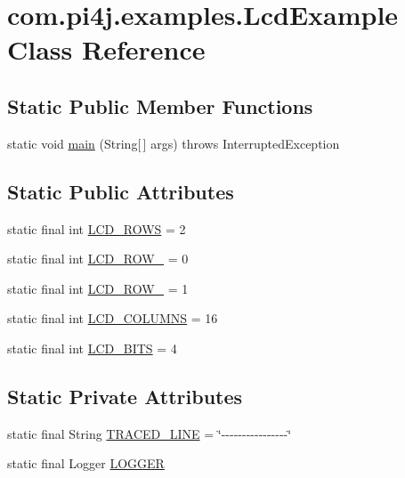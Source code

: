 \hypertarget{classcom_1_1pi4j_1_1examples_1_1LcdExample}{}\section{com.\+pi4j.\+examples.\+Lcd\+Example Class Reference}
\label{classcom_1_1pi4j_1_1examples_1_1LcdExample}
\subsection*{Static Public Member Functions}
\begin{DoxyCompactItemize}
\item 
static void \hyperlink{classcom_1_1pi4j_1_1examples_1_1LcdExample_a09001ffe6860f9ff7d1b9b195eecf3a6}{main} (String\mbox{[}$\,$\mbox{]} args)  throws Interrupted\+Exception 
\end{DoxyCompactItemize}
\subsection*{Static Public Attributes}
\begin{DoxyCompactItemize}
\item 
static final int \hyperlink{classcom_1_1pi4j_1_1examples_1_1LcdExample_aa5552e877b90e91658ff69c91110f97a}{L\+C\+D\+\_\+\+R\+O\+W\+S} = 2
\item 
static final int \hyperlink{classcom_1_1pi4j_1_1examples_1_1LcdExample_a2a8ff60a46f85aba5aa1e31b179825f2}{L\+C\+D\+\_\+\+R\+O\+W\+\_} = 0
\item 
static final int \hyperlink{classcom_1_1pi4j_1_1examples_1_1LcdExample_a05c3899e43e7d71d9effb85603abb271}{L\+C\+D\+\_\+\+R\+O\+W\+\_} = 1
\item 
static final int \hyperlink{classcom_1_1pi4j_1_1examples_1_1LcdExample_a222b7e1bbc25b9da748fcd91edf8da1c}{L\+C\+D\+\_\+\+C\+O\+L\+U\+M\+N\+S} = 16
\item 
static final int \hyperlink{classcom_1_1pi4j_1_1examples_1_1LcdExample_ad2cf111a06d28ba735a13b43347b50b8}{L\+C\+D\+\_\+\+B\+I\+T\+S} = 4
\end{DoxyCompactItemize}
\subsection*{Static Private Attributes}
\begin{DoxyCompactItemize}
\item 
static final String \hyperlink{classcom_1_1pi4j_1_1examples_1_1LcdExample_a1a5efab5ce2806cbf7b512a6c76656c2}{T\+R\+A\+C\+E\+D\+\_\+\+L\+I\+N\+E} = \char`\"{}-\/-\/-\/-\/-\/-\/-\/-\/-\/-\/-\/-\/-\/-\/-\/-\/\char`\"{}
\item 
static final Logger \hyperlink{classcom_1_1pi4j_1_1examples_1_1LcdExample_ac6f94512f51589d4a4e26b46c7688ae1}{L\+O\+G\+G\+E\+R}
\end{DoxyCompactItemize}


